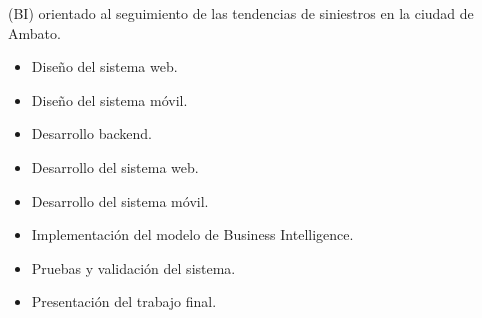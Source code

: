 \begin{itemize}
            (BI) orientado al seguimiento de
            las tendencias de siniestros en la
            ciudad de Ambato.
            \begin{itemize}
                  \item Diseño del sistema web.
                  \item Diseño del sistema móvil.
                  \item Desarrollo backend.
                  \item Desarrollo del sistema web.
                  \item Desarrollo del sistema móvil.
                  \item Implementación del modelo de
                        Business Intelligence.
                  \item Pruebas y validación del sistema.
                  \item Presentación del trabajo final.
            \end{itemize}

\end{itemize}